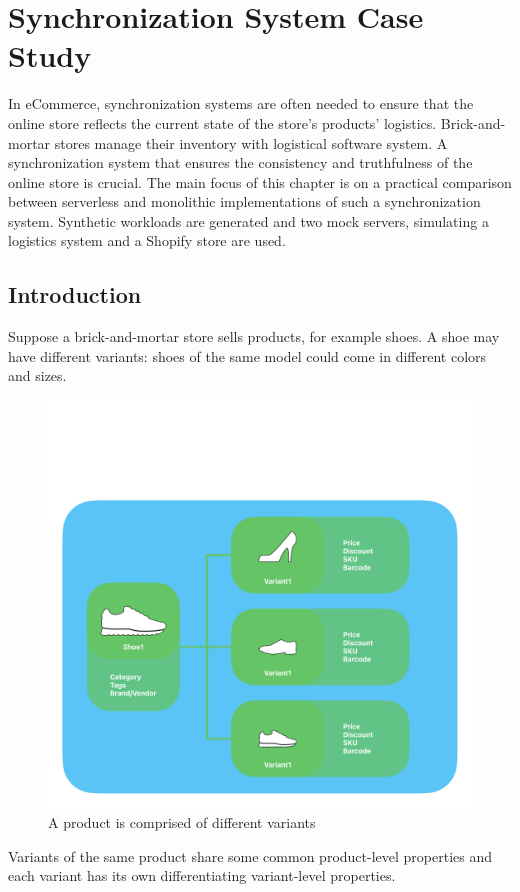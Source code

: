 \chapter{Synchronization System Case Study}
\etocsettocstyle{\rule{\textwidth}{1pt}}{\rule{\textwidth}{1pt}} %
\localtableofcontents
\label{chap:synchronization}

In eCommerce, synchronization systems are often needed to ensure that the online store reflects the current state of the store's products' logistics. Brick-and-mortar stores manage their inventory with logistical software system. A synchronization system that ensures the consistency and truthfulness of the online store is crucial.
The main focus of this chapter is on a practical comparison between serverless and monolithic implementations of such a synchronization system. Synthetic workloads are generated and two mock servers, simulating a logistics system and a Shopify store are used.
\section{Introduction}
Suppose a brick-and-mortar store sells products, for example shoes. A shoe may have different variants: shoes of the same model could come in different colors and sizes.
\begin{figure}[h!]
    \centering
    \includegraphics[width=\textwidth]{media/Product_variants.pdf}
    \caption{A product is comprised of different variants}
    \label{fig:rate_unlimited_comparison}
\end{figure}
Variants of the same product share some common product-level properties and each variant has its own differentiating variant-level properties. 


